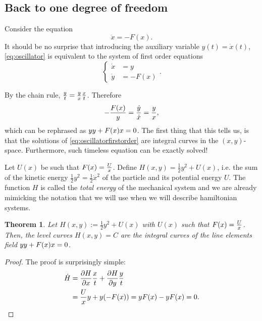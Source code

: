 \documentclass[english,fontsize=11pt,paper=a5,oneside]{scrbook}
\let\d\relax
\DeclareMathOperator{\d}{d}
\newtheorem{theorem}{Theorem}[chapter]
\theoremstyle{definition}
\begin{document}
\subsection{Back to one degree of freedom}\label{sec:bdf}

Consider the equation
\begin{equation}\label{eq:oscillator}
    \ddot x = - F(x).
\end{equation}
It should be no surprise that introducing the auxiliary variable $y(t) = \dot x(t)$, \eqref{eq:oscillator} is equivalent to the system of first order equations
\begin{equation}\label{eq:oscillatorfirstorder}
    \left\lbrace
    \begin{aligned}
        \dot x &= y \\
        \dot y &= -F(x)
    \end{aligned}
    \right..
\end{equation}

By the chain rule, $\frac{\d y}{\d t} = \frac{\d y}{\d x} \frac{\d x}{\d t}$. Therefore
\begin{equation}
    - \frac{F(x)}y = \frac{\dot y}{\dot x} = \frac{\d y}{\d x},
\end{equation}
which can be rephrased as $y \d y + F(x) \d x = 0$.
The first thing that this tells us, is that the solutions of \eqref{eq:oscillatorfirstorder} are integral curves in the $(x,y)$-space.
Furthermore, such timeless equation can be exactly solved!

Let $U(x)$ be such that $F(x) = \frac{\d U}{\d x}$. Define $H(x, y) = \frac12 y^2 + U(x)$, i.e. the sum of the kinetic energy $\frac12 y^2 = \frac12 {\dot x}^2$ of the particle and its potential energy $U$.
The function $H$ is called the \emph{total energy} of the mechanical system and we are already mimicking the notation that we will use when we will describe hamiltonian systems.

\begin{theorem}\label{thm:ham1}
    Let $H(x, y) := \frac12 y^2 + U(x)$ with $U(x)$ such that $F(x) = \frac{\d U}{\d x}$.
    Then, the level curves $H(x,y) = C$ are the integral curves of the line elements field $y \d y + F(x) \d x = 0$.
\end{theorem}
\begin{proof}
The proof is surprisingly simple:
\begin{align*}
    \dot H &= \frac{\partial H}{\partial x}\frac{\d x}{\d t} + \frac{\partial H}{\partial y}\frac{\d y}{\d t} \\
    & = \frac{\d U}{\d x} y + y (-F(x))
    = y F(x) - y F(x) = 0.
\end{align*}
\end{proof}
\end{document}
